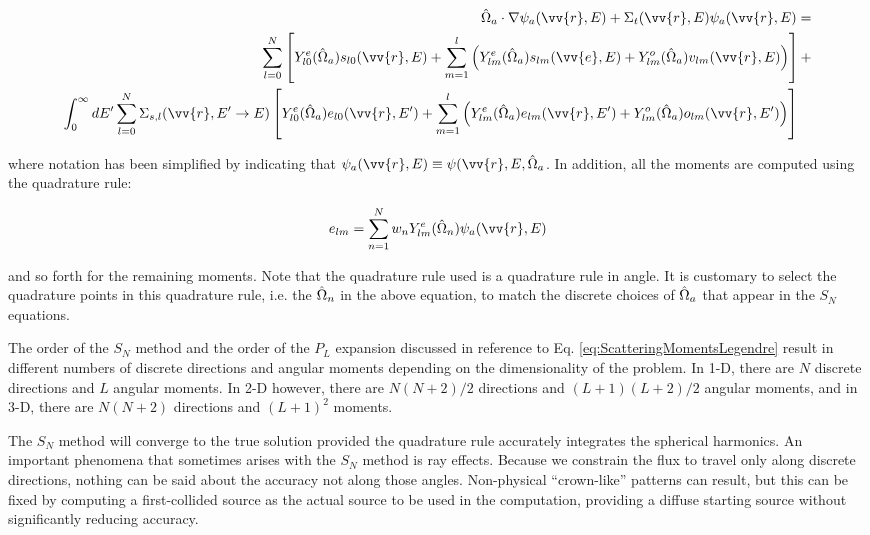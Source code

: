 \begin{equation}
\label{eq:SnGeneral}
\begin{aligned}
 \hO  _a\cdot\nabla\psi_a(\vv{r}, E) + 
 \Sigma_t(\vv{r},E)\psi_a(\vv{r}, E) = \\
\sum_{l=0}^{N}\left\lbrack Y_{l0}^e(\hO  _a)s_{l0}(\vv{r},E)+\sum_{m=1}^{l}\left(Y_{lm}^e(\hO  _a)s_{lm}(\vv{e},E)+Y_{lm}^o(\hO  _a)v_{lm}(\vv{r},E)\right)\right\rbrack+\\
\int_{0}^{\infty}dE' \sum_{l=0}^{N}\Sigma_{s,l}(\vv{r}, E'\rightarrow E)\left\lbrack Y_{l0}^e(\hO  _a)e_{l0}(\vv{r},E')+\sum_{m=1}^{l}\left(Y_{lm}^e(\hO  _a)e_{lm}(\vv{r},E')+Y_{lm}^o(\hO  _a)o_{lm}(\vv{r},E')\right)\right\rbrack\quad\\
\end{aligned}
\end{equation}

where notation has been simplified by indicating that \(\psi_a(\vv{r},E)\equiv\psi(\vv{r},E,\hO  _a\). In addition, all the moments are computed using the quadrature rule:

\begin{equation}
e_{lm}=\sum_{n=1}^{N} w_nY_{lm}^e(\hO  _n)\psi_a(\vv{r},E)
\end{equation}

and so forth for the remaining moments. Note that the quadrature rule used is a quadrature rule in angle. It is customary to select the quadrature points in this quadrature rule, i.e. the \(\hat{\Omega}  _n\) in the above equation, to match the discrete choices of \(\hat{\Omega}  _a\) that appear in the \(S_N\) equations. 

The order of the \(S_N\) method and the order of the \(P_L\) expansion discussed in reference to Eq. \ref{eq:ScatteringMomentsLegendre} result in different numbers of discrete directions and angular moments depending on the dimensionality of the problem. In 1-D, there are \(N\) discrete directions and \(L\) angular moments. In 2-D however, there are \(N(N+2)/2\) directions and \((L+1)(L+2)/2\) angular moments, and in 3-D, there are \(N(N+2)\) directions and \((L+1)^2\) moments. 

The \(S_N\) method will converge to the true solution provided the quadrature rule accurately integrates the spherical harmonics. An important phenomena that sometimes arises with the \(S_N\) method is ray effects. Because we constrain the flux to travel only along discrete directions, nothing can be said about the accuracy not along those angles. Non-physical ``crown-like'' patterns can result, but this can be fixed by computing a first-collided source as the actual source to be used in the computation, providing a diffuse starting source without significantly reducing accuracy. 

